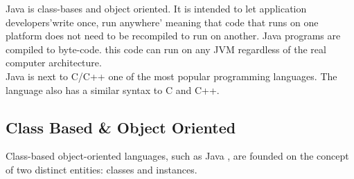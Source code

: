 Java is class-bases and object oriented. It is intended to let application developers'write once, run anywhere' meaning that code that runs on one platform does not need to be recompiled to run on another. Java programs are compiled to byte-code. this code can run on any JVM regardless of the real computer architecture.\cite{javaWiki}
\\

Java is next to C/C++ one of the most popular programming languages.\cite{progLangPop} The language also has a similar syntax to C and C++.

\subsection{Class Based \& Object Oriented}
Class-based object-oriented languages, such as Java , are founded on the concept of two distinct entities: classes and instances.\cite{javaObjectClass} 

